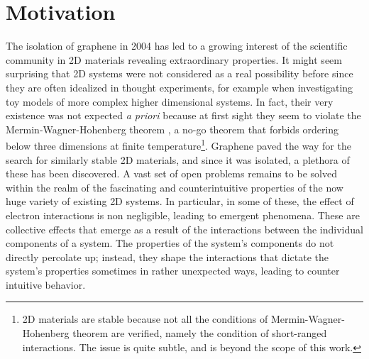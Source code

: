 \section{Motivation}
\label{sec:motivation}

The isolation of graphene in 2004 has led to a growing interest of the scientific community in \ac{2D} materials revealing extraordinary properties.
It might seem surprising that \ac{2D} systems were not considered as a real possibility before since they are often idealized in thought experiments, for example when investigating toy models of more complex higher dimensional systems.
In fact, their very existence was not expected \emph{a priori} because at first sight they seem to violate the Mermin-Wagner-Hohenberg theorem \cite{mermin_absence_1966, coleman_there_1973, hohenberg_existence_1967}, a no-go theorem that forbids ordering below three dimensions at finite temperature\footnote{\ac{2D} materials are stable because not all the conditions of Mermin-Wagner-Hohenberg theorem are verified, namely the condition of short-ranged interactions. The issue is quite subtle, and is beyond the scope of this work.}.
Graphene paved the way for the search for similarly stable \ac{2D} materials, and since it was isolated, a plethora of these has been discovered.
A vast set of open problems remains to be solved within the realm of the fascinating and counterintuitive properties of the now huge variety of existing \ac{2D} systems.
In particular, in some of these, the effect of electron interactions is non negligible, leading to emergent phenomena.
These are collective effects that emerge as a result of the interactions between the individual components of a system.
The properties of the system's components do not directly percolate up; instead, they shape the interactions that dictate the system's properties sometimes in rather unexpected ways, leading to counter intuitive behavior.

